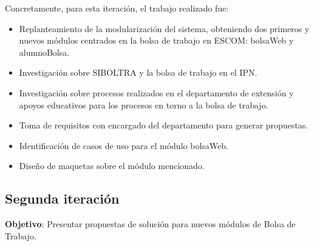 \newline
Concretamente, para esta iteración, el trabajo realizado fue: 
\begin{itemize}
	\item Replanteamiento de la modularización del sistema, obteniendo dos primeros y nuevos módulos centrados en la bolsa de trabajo en ESCOM: bolsaWeb y alumnoBolsa.
	\item Investigación sobre SIBOLTRA y la bolsa de trabajo en el IPN.
	\item Investigación sobre procesos realizados en el departamento de extensión y apoyos educativos para los procesos en torno a la bolsa de trabajo.
	\item Toma de requisitos con encargado del departamento para generar propuestas.
	\item Identificación de casos de uso para el módulo bolsaWeb.
	\item Diseño de maquetas sobre el módulo mencionado.
\end{itemize}


\subsection{Segunda iteración}

\noindent
\textbf{Objetivo}: Presentar propuestas de solución para nuevos módulos de Bolsa de Trabajo.
\newline

